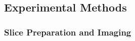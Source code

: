 

\subsection{Experimental Methods} \label{sec:exp}

\subsubsection{Slice Preparation and Imaging} 

